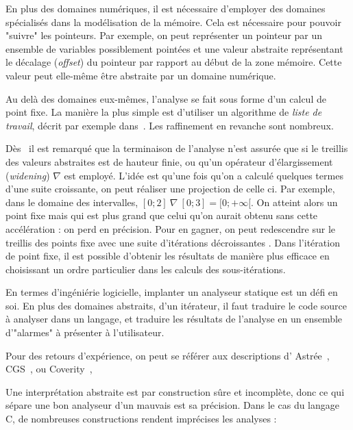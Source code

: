 En plus des domaines numériques, il est nécessaire d'employer des domaines
spécialisés dans la modélisation de la mémoire. Cela est nécessaire pour pouvoir
"suivre" les pointeurs. Par exemple, on peut représenter un pointeur par un
ensemble de variables possiblement pointées et une valeur abstraite représentant
le décalage (\emph{offset}) du pointeur par rapport au début de la zone mémoire.
Cette valeur peut elle-même être abstraite par un domaine numérique.

Au delà des domaines eux-mêmes, l'analyse se fait sous forme d'un calcul de
point fixe. La manière la plus simple est d'utiliser un algorithme de
\emph{liste de travail}, décrit par exemple dans~\cite{tapsoft95}. Les
raffinement en revanche sont nombreux.

Dès~\cite{Cousot77} il est remarqué que la terminaison de l'analyse n'est
assurée que si le treillis des valeurs abstraites est de hauteur finie, ou qu'un
opérateur d'élargissement (\emph{widening}) $\nabla$ est employé. L'idée est
qu'une fois qu'on a calculé quelques termes d'une suite croissante, on peut
réaliser une projection de celle ci. Par exemple, dans le domaine des
intervalles, $[0;2]~\nabla~[0;3] = [0;+\infty[$. On atteint alors un point fixe
mais qui est plus grand que celui qu'on aurait obtenu sans cette accélération :
on perd en précision. Pour en gagner, on peut redescendre sur le treillis des
points fixe avec une suite d'itérations décroissantes \cite{granger}. Dans
l'itération de point fixe, il est possible d'obtenir les résultats de manière
plus efficace en choisissant un ordre particulier dans les calculs des
sous-itérations\cite{policy}.


En termes d'ingéniérie logicielle, implanter un analyseur statique est un défi
en soi. En plus des domaines abstraits, d'un itérateur, il faut traduire le code
source à analyser dans un langage, et traduire les résultats de l'analyse en un
ensemble d'"alarmes" à présenter à l'utilisateur.

Pour des retours d'expérience, on peut se référer aux descriptions d'
Astrée~\cite{Astree04,Astree05,AstreeScale},
CGS~\cite{cgs},
ou Coverity~\cite{coverityBillion},


Une interprétation abstraite est par construction sûre et incomplète, donc ce
qui sépare une bon analyseur d'un mauvais est sa précision. Dans le cas du
langage C, de nombreuses constructions rendent imprécises les analyses :

